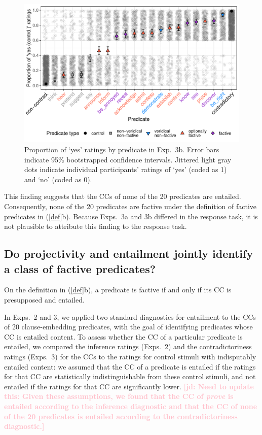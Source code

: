 \documentclass[11pt,fleqn]{article}
\newcommand{\jd}[1]{\textbf{\textcolor{Pink}{[jd: #1]}}}
\newcommand{\6}{\mbox{$[\hspace*{-.6mm}[$}}
\newcommand{\9}{\mbox{$]\hspace*{-.6mm}]$}}
\begin{document}
{\begin{figure}
\centering
\includegraphics[width=.7\paperwidth]{../../results/6-veridicality2-binary/graphs/proportion-by-predicate-variability-individual}
\caption{Proportion of `yes' ratings by predicate in Exp.~3b. Error bars indicate 95\% bootstrapped confidence intervals. Jittered light gray dots indicate individual participants' ratings of `yes' (coded as 1) and `no' (coded as 0). }
\label{fig:3bresults}
\end{figure}

This finding suggests that the CCs of none of the 20 predicates are entailed. Consequently, none of the 20 predicates are factive under the definition of factive predicates in (\ref{def}b). Because Exps.~3a and 3b differed in the response task, it is not plausible to attribute this finding to the response task. 

\subsection{Do projectivity and entailment jointly identify a class of factive predicates?}\label{s33}

On the definition in (\ref{def}b), a predicate is factive if and only if its CC is presupposed and entailed.

In Exps.~2 and 3, we applied two standard diagnostics for entailment to the CCs of 20 clause-embedding predicates, with the goal of identifying predicates whose CC is entailed content. To assess whether the CC of a particular predicate is entailed, we compared the inference ratings (Exps.~2) and the contradictoriness ratings (Exps.~3) for the CCs to the ratings for control stimuli with indisputably entailed content: we assumed that the CC of a predicate is entailed if the ratings for that CC are statistically indistinguishable from these control stimuli, and not entailed if the ratings for that CC are significantly lower. \jd{Need to update this: Given these assumptions, we found that the CC of {\em prove} is entailed according to the inference diagnostic and that the CC of none of the 20 predicates is entailed according to the contradictoriness diagnostic.}

}
\end{document}
